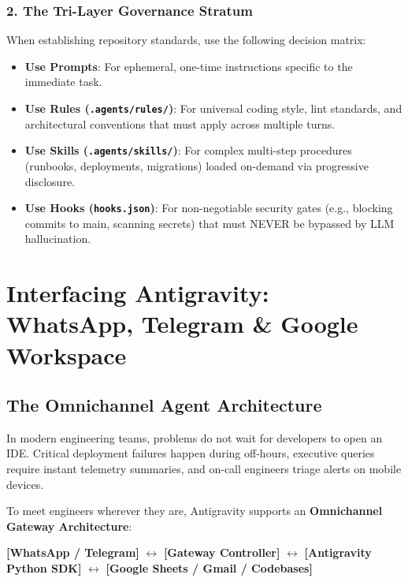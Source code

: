 \documentclass[11pt,a4paper,oneside]{book}
\begin{document}
\subsection{2. The Tri-Layer Governance Stratum}
When establishing repository standards, use the following decision matrix:
\begin{itemize}
    \item \textbf{Use Prompts}: For ephemeral, one-time instructions specific to the immediate task.
    \item \textbf{Use Rules (\texttt{.agents/rules/})}: For universal coding style, lint standards, and architectural conventions that must apply across multiple turns.
    \item \textbf{Use Skills (\texttt{.agents/skills/})}: For complex multi-step procedures (runbooks, deployments, migrations) loaded on-demand via progressive disclosure.
    \item \textbf{Use Hooks (\texttt{hooks.json})}: For non-negotiable security gates (e.g., blocking commits to main, scanning secrets) that must NEVER be bypassed by LLM hallucination.
\end{itemize}

\chapter{Interfacing Antigravity: WhatsApp, Telegram \& Google Workspace}

\section{The Omnichannel Agent Architecture}
In modern engineering teams, problems do not wait for developers to open an IDE. Critical deployment failures happen during off-hours, executive queries require instant telemetry summaries, and on-call engineers triage alerts on mobile devices.

To meet engineers wherever they are, Antigravity supports an \textbf{Omnichannel Gateway Architecture}:

\begin{center}
\textbf{[WhatsApp / Telegram]} $\longleftrightarrow$ \textbf{[Gateway Controller]} $\longleftrightarrow$ \textbf{[Antigravity Python SDK]} $\longleftrightarrow$ \textbf{[Google Sheets / Gmail / Codebases]}
\end{center}
\end{document}
